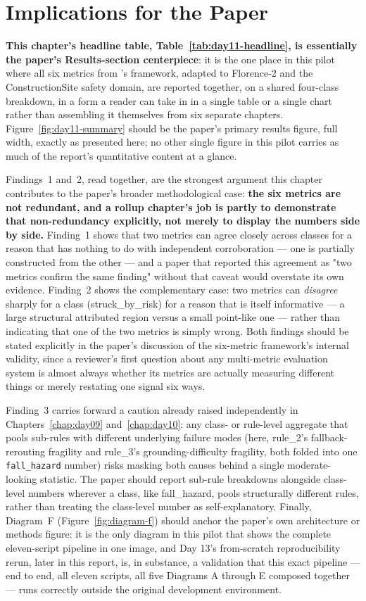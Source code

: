 \section{Implications for the Paper}

\textbf{This chapter's headline table, Table~\ref{tab:day11-headline}, is essentially the
paper's Results-section centerpiece}: it is the one place in this pilot where all six metrics
from \citep{arreche2024exai}'s framework, adapted to Florence-2 and the ConstructionSite safety
domain, are reported together, on a shared four-class breakdown, in a form a reader can take
in in a single table or a single chart rather than assembling it themselves from six separate
chapters. Figure~\ref{fig:day11-summary} should be the paper's primary results figure, full
width, exactly as presented here; no other single figure in this pilot carries as much of the
report's quantitative content at a glance.

Findings~1 and~2, read together, are the strongest argument this chapter contributes to the
paper's broader methodological case: \textbf{the six metrics are not redundant, and a rollup
chapter's job is partly to demonstrate that non-redundancy explicitly, not merely to display
the numbers side by side.} Finding~1 shows that two metrics can agree closely across classes
for a reason that has nothing to do with independent corroboration --- one is partially
constructed from the other --- and a paper that reported this agreement as "two metrics confirm
the same finding" without that caveat would overstate its own evidence. Finding~2 shows the
complementary case: two metrics can \emph{disagree} sharply for a class (struck\_by\_risk) for a
reason that is itself informative --- a large structural attributed region versus a small
point-like one --- rather than indicating that one of the two metrics is simply wrong. Both
findings should be stated explicitly in the paper's discussion of the six-metric framework's
internal validity, since a reviewer's first question about any multi-metric evaluation system is
almost always whether its metrics are actually measuring different things or merely restating
one signal six ways.

Finding~3 carries forward a caution already raised independently in Chapters~\ref{chap:day09}
and~\ref{chap:day10}: any class- or rule-level aggregate that pools sub-rules with different
underlying failure modes (here, rule\_2's fallback-rerouting fragility and rule\_3's
grounding-difficulty fragility, both folded into one \texttt{fall\_hazard} number) risks masking
both causes behind a single moderate-looking statistic. The paper should report sub-rule
breakdowns alongside class-level numbers wherever a class, like fall\_hazard, pools structurally
different rules, rather than treating the class-level number as self-explanatory. Finally,
Diagram~F (Figure~\ref{fig:diagram-f}) should anchor the paper's own architecture or methods
figure: it is the only diagram in this pilot that shows the complete eleven-script pipeline in
one image, and Day 13's from-scratch reproducibility rerun, later in this report, is, in
substance, a validation that this exact pipeline --- end to end, all eleven scripts, all five
Diagrams A through E composed together --- runs correctly outside the original development
environment.
